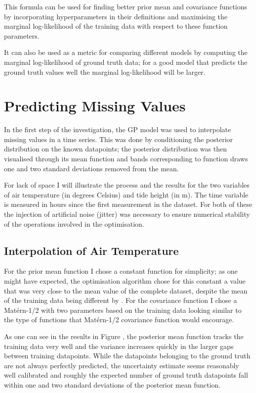 \documentclass{article}
\begin{document}
            This formula can be used for finding better prior mean and covariance functions by incorporating hyperparameters in their definitions and maximising the marginal log-likelihood of the training data with respect to these function parameters.

            It can also be used as a metric for comparing different models by computing the marginal log-likelihood of ground truth data; for a good model that predicts the ground truth values well the marginal log-likelihood will be larger.

    \section{Predicting Missing Values}

            In the first step of the investigation, the GP model was used to interpolate missing values in a time series. This was done by conditioning the posterior distribution on the known datapoints; the posterior distribution was then visualised through its mean function and bands corresponding to function draws one and two standard deviations removed from the mean.
    
            For lack of space I will illustrate the process and the results for the two variables of air temperature (in degrees Celsius) and tide height (in m). The time variable is measured in hours since the first measurement in the dataset. For both of these the injection of artificial noise (jitter) was necessary to ensure numerical stability of the operations involved in the optimisation.
            
            \subsection{Interpolation of Air Temperature}

                For the prior mean function I chose a constant function for simplicity; as one might have expected, the optimisation algorithm chose for this constant a value that was very close to the mean value of the complete dataset, despite the mean of the training data being different by %
                . For the covariance function I chose a Matérn-1/2 with two parameters based on the training data looking similar to the type of functions that Matérn-1/2 covariance function would encourage.

                As one can see in the results in Figure %
                , the posterior mean function tracks the training data very well and the variance increases quickly in the larger gaps between training datapoints. While the datapoints belonging to the ground truth are not always perfectly predicted, the uncertainty estimate seems reasonably well calibrated and roughly the expected number of ground truth datapoints fall within one and two standard deviations of the posterior mean function.
\end{document}
